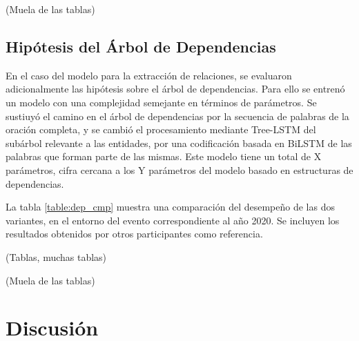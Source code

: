 (Muela de las tablas)

\subsection{Hipótesis del Árbol de Dependencias}

En el caso del modelo para la extracción de relaciones, se evaluaron adicionalmente las hipótesis sobre el árbol de dependencias.
Para ello se entrenó un modelo con una complejidad semejante en términos de parámetros.
Se sustiuyó el camino en el árbol de dependencias por la secuencia de palabras de la oración completa, y se cambió el procesamiento mediante Tree-LSTM del subárbol relevante a las entidades, por una codificación basada en BiLSTM de las palabras que forman parte de las mismas.
Este modelo tiene un total de X parámetros, cifra cercana a los Y parámetros del modelo basado en estructuras de dependencias.

La tabla \ref{table:dep_cmp} muestra una comparación del desempeño de las dos variantes, en el entorno del evento correspondiente al año 2020. Se incluyen los resultados obtenidos por otros participantes como referencia.

(Tablas, muchas tablas)

(Muela de las tablas)


\section{Discusión}
